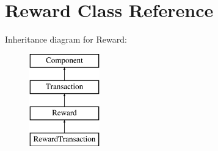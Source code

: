 \hypertarget{classReward}{}\section{Reward Class Reference}
\label{classReward}
Inheritance diagram for Reward\+:\begin{figure}[H]
\begin{center}
\leavevmode
\includegraphics[height=4.000000cm]{classReward}
\end{center}
\end{figure}
